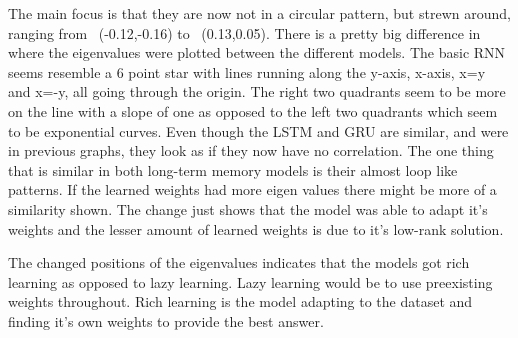 \documentclass{article}
\begin{document}
 The main focus is that they are now not in a circular pattern, but strewn around, ranging from ~(-0.12,-0.16) to ~(0.13,0.05). There is a pretty big difference in where the eigenvalues were plotted between the different models. The basic RNN seems resemble a 6 point star with lines running along the y-axis, x-axis, x=y and x=-y, all going through the origin. The right two quadrants seem to be more on the line with a slope of one as opposed to the left two quadrants which seem to be exponential curves. Even though the LSTM and GRU are similar, and were in previous graphs, they look as if they now have no correlation. The one thing that is similar in both long-term memory models is their almost loop like patterns. If the learned weights had more eigen values there might be more of a similarity shown. The change just shows that the model was able to adapt it's weights and the lesser amount of learned weights is due to it's low-rank solution.
\par\noindent{}
The changed positions of the eigenvalues indicates that the models got rich learning as opposed to lazy learning\cite{FLESCH20221258}. Lazy learning would be to use preexisting weights throughout. Rich learning is the model adapting to the dataset and finding it's own weights to provide the best answer.
\end{document}
